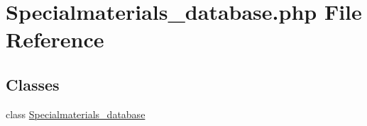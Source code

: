 \hypertarget{Specialmaterials__database_8php}{\section{Specialmaterials\+\_\+database.\+php File Reference}
\label{Specialmaterials__database_8php}
}
\subsection*{Classes}
\begin{DoxyCompactItemize}
\item 
class \hyperlink{classSpecialmaterials__database}{Specialmaterials\+\_\+database}
\end{DoxyCompactItemize}
